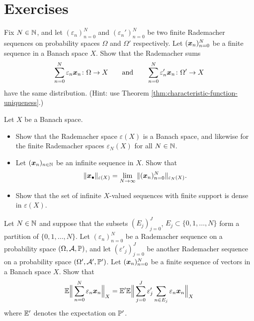 \section*{Exercises}

\begin{exercise}\label{ex:rad-sum-dist}
  Fix $N \in \N$, and let $(\varepsilon_{n})_{n=0}^{N}$ and $(\varepsilon_{n}')_{n=0}^{N}$ be two finite Rademacher sequences on probability spaces $\Omega$ and $\Omega'$ respectively.
  Let $(\mb{x}_{n})_{n=0}^{N}$ be a finite sequence in a Banach space $X$.
  Show that the Rademacher sums
  \begin{equation*}
    \sum_{n = 0}^{N} \varepsilon_n \mb{x}_{n} \colon \Omega \to X \qquad \text{and} \qquad
    \sum_{n = 0}^{N} \varepsilon_n' \mb{x}_{n} \colon \Omega' \to X
  \end{equation*}
  have the same distribution.
  (Hint: use Theorem \ref{thm:characteristic-function-uniqueness}.) 
\end{exercise}

\begin{exercise}\label{ex:on-rad-spaces}
  Let $X$ be a Banach space.
  \begin{itemize}
  \item
    Show that the Rademacher space $\varepsilon(X)$ is a Banach space, and likewise for the finite Rademacher spaces $\varepsilon_{N}(X)$ for all $N \in \N$.
  \item
    Let $(\mb{x}_{n})_{n \in \N}$ be an infinite sequence in $X$.
    Show that
    \begin{equation*}
      \|\mb{x}_{\bullet}\|_{\varepsilon(X)} = \lim_{N \to \infty} \|(\mb{x}_{n})_{n=0}^{N}\|_{\varepsilon_{N}(X)}.
    \end{equation*}
  \item
    Show that the set of infinite $X$-valued sequences with finite support is dense in $\varepsilon(X)$.
  \end{itemize}
\end{exercise}

\begin{exercise}
  Let $N \in \N$ and suppose that the subsets $(E_{j})_{j=0}^{J}$, $E_{j} \subset \{0,1,\ldots,N\}$ form a partition of $\{0,1,\ldots,N\}$.
  Let $(\varepsilon_{n})_{n=0}^{N}$ be a Rademacher sequence on a probability space $(\Omega,\mc{A},\P)$, and let $(\varepsilon'_{j})_{j=0}^{J}$ be another Rademacher sequence on a probability space $(\Omega', \mc{A}', \P')$.
  Let $(\mb{x}_{n})_{n=0}^{N}$ be a finite sequence of vectors in a Banach space $X$.
  Show that
  \begin{equation*}
    \E \Big\| \sum_{n=0}^{N} \varepsilon_{n} \mb{x}_{n} \Big\|_{X} = \E' \E \Big\| \sum_{j=0}^{J} \varepsilon'_{j} \sum_{n \in E_{j}} \varepsilon_{n} \mb{x}_{n} \Big\|_{X}
  \end{equation*}
  where $\E'$ denotes the expectation on $\P'$.
\end{exercise}

